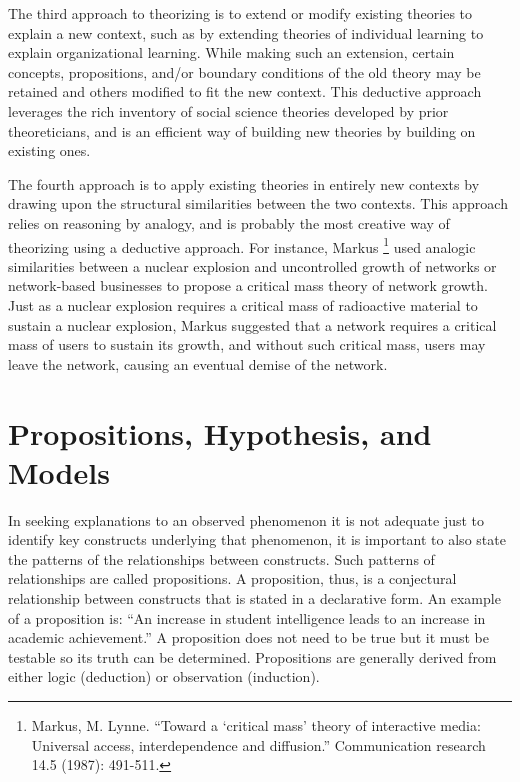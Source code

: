 \documentclass[]{book}
\let\rmarkdownfootnote\footnote%
\def\footnote{\protect\rmarkdownfootnote}
\theoremstyle{definition}
\theoremstyle{definition}
\theoremstyle{definition}
\theoremstyle{remark}
\begin{document}
The third approach to theorizing is to extend or modify existing
theories to explain a new context, such as by extending theories of
individual learning to explain organizational learning. While making
such an extension, certain concepts, propositions, and/or boundary
conditions of the old theory may be retained and others modified to fit
the new context. This deductive approach leverages the rich inventory of
social science theories developed by prior theoreticians, and is an
efficient way of building new theories by building on existing ones.

The fourth approach is to apply existing theories in entirely new
contexts by drawing upon the structural similarities between the two
contexts. This approach relies on reasoning by analogy, and is probably
the most creative way of theorizing using a deductive approach. For
instance, Markus \footnote{Markus, M. Lynne. ``Toward a `critical mass'
  theory of interactive media: Universal access, interdependence and
  diffusion.'' Communication research 14.5 (1987): 491-511.} used
analogic similarities between a nuclear explosion and uncontrolled
growth of networks or network-based businesses to propose a critical
mass theory of network growth. Just as a nuclear explosion requires a
critical mass of radioactive material to sustain a nuclear explosion,
Markus suggested that a network requires a critical mass of users to
sustain its growth, and without such critical mass, users may leave the
network, causing an eventual demise of the network.

\hypertarget{propositions-hypothesis-and-models}{%
\section{Propositions, Hypothesis, and
Models}\label{propositions-hypothesis-and-models}}

In seeking explanations to an observed phenomenon it is not adequate
just to identify key constructs underlying that phenomenon, it is
important to also state the patterns of the relationships between
constructs. Such patterns of relationships are called propositions. A
proposition, thus, is a conjectural relationship between constructs that
is stated in a declarative form. An example of a proposition is: ``An
increase in student intelligence leads to an increase in academic
achievement.'' A proposition does not need to be true but it must be
testable so its truth can be determined. Propositions are generally
derived from either logic (deduction) or observation (induction).
\end{document}
